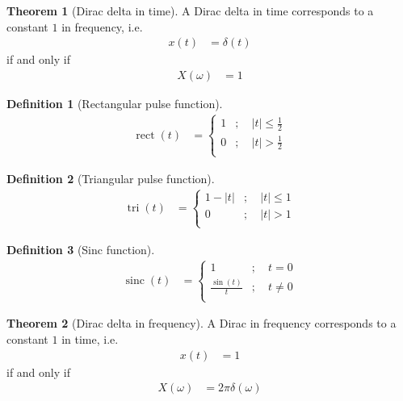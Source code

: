 \documentclass[titlepage, fleqn, a4paper, 12pt, twoside]{article}
\theoremstyle{definition}
\newtheorem{definition}{Definition}
\theoremstyle{theorem}
\newtheorem{theorem}{Theorem}
\DeclareMathOperator{\sinc}{\mathrm{sinc}}
\DeclareMathOperator{\rect}{\mathrm{rect}}
\DeclareMathOperator{\tri}{\mathrm{tri}}
\begin{document}
\begin{theorem}[Dirac delta in time]
	A Dirac delta in time corresponds to a constant $1$ in frequency, i.e.
	\begin{align*}
		x(t) &= \delta(t)
	\end{align*}
	if and only if
	\begin{align*}
		X(\omega) &= 1
	\end{align*}
	\label{thm:Dirac_delta_in_time}
\end{theorem}

\begin{definition}[Rectangular pulse function]
	\begin{align*}
		\rect(t) &=
			\begin{cases}
				1 &;\quad |t| \le \frac{1}{2}\\
				0 &;\quad |t| > \frac{1}{2}\\
			\end{cases}
	\end{align*}
	\label{def:rect_function}
\end{definition}

\begin{definition}[Triangular pulse function]
	\begin{align*}
		\tri(t) &=
			\begin{cases}
				1 - |t| &;\quad |t| \le 1\\
				0 &;\quad |t| > 1\\
			\end{cases}
	\end{align*}
	\label{def:tri_function}
\end{definition}

\begin{definition}[Sinc function]
	\begin{align*}
		\sinc(t) &=
			\begin{cases}
				1 &;\quad t = 0\\
				\frac{\sin(t)}{t} &;\quad t \neq 0\\
			\end{cases}
	\end{align*}
	\label{def:sinc_function}
\end{definition}

\begin{theorem}[Dirac delta in frequency]
	A Dirac in frequency corresponds to a constant $1$ in time, i.e.
	\begin{align*}
		x(t) &= 1
	\end{align*}
	if and only if
	\begin{align*}
		X(\omega) &= 2 \pi \delta(\omega)
	\end{align*}
	\label{thm:Dirac_delta_in_frequency}
\end{theorem}
\end{document}
